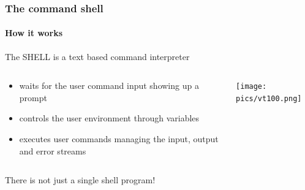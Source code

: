 \documentclass[unknownkeysallowed, 10pt, a4 paper, handout]{beamer}
\begin{document}
\begin{frame}[label=shell]
  \frametitle{The command shell}
  \framesubtitle{How it works}
  The SHELL is a text based command interpreter
  \begin{columns}[T]
    \begin{column}{.60\textwidth}
    \begin{center}
    \begin{block}
    \small{
      \begin{itemize}
        \item waits for the user command input showing up a prompt 
        \item controls the user environment through variables
        \item executes user commands managing the input, output
                 and error streams
      \end{itemize}
      }
    \end{block}
    \end{center}
    \end{column}
    \hfill
    \begin{column}{.40\textwidth}
      \begin{center}
        \texttt{[image: pics/vt100.png]}
      \end{center}
    \end{column}
  \end{columns}
  \begin{center}
    There is not just a single shell program!
  \end{center}
\end{frame}
\end{document}
